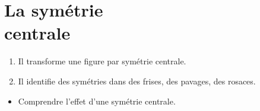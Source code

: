 \themaE
\graphicspath{{../../S12_Symetrie_centrale/Images/}}

\chapter{La symétrie\\centrale}
\label{S12}

\newcommand{\hexa}[2]{\pspolygon[fillstyle=solid,fillcolor=#2](#1;0)(#1;60)(#1;120)(#1;180)(#1;-120)(#1;-60)}


\begin{autoeval}
   \small
   \begin{enumerate}
      \item Il transforme une figure par symétrie centrale.
      \item Il identifie des symétries dans des frises, des pavages, des rosaces.
   \end{enumerate}
\end{autoeval}

\begin{prerequis}
   \begin{itemize}
      \item[\com] Comprendre l'effet d'une symétrie centrale.
   \end{itemize}
\end{prerequis}

\vfill

